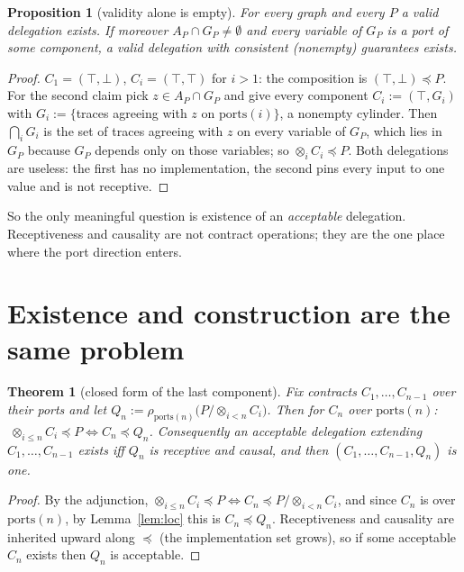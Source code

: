 \documentclass[10pt]{article}
\theoremstyle{plain}\newtheorem{theorem}{Theorem}\newtheorem{lemma}{Lemma}\newtheorem{proposition}{Proposition}\newtheorem{corollary}{Corollary}
\theoremstyle{definition}\newtheorem{definition}{Definition}
\newcommand{\refines}{\preccurlyeq}\newcommand{\comp}{\otimes}\newcommand{\Tr}{\mathrm{Tr}}
\newcommand{\ports}{\mathrm{ports}}\newcommand{\inp}{\mathrm{in}}\newcommand{\outp}{\mathrm{out}}
\begin{document}
\begin{proposition}[validity alone is empty]
For every graph and every $P$ a valid delegation exists. If moreover $A_P\cap G_P\neq\emptyset$ and every variable of $G_P$ is a port of some component, a valid delegation with consistent (nonempty) guarantees exists.
\end{proposition}
\begin{proof}
$C_1=(\top,\bot)$, $C_i=(\top,\top)$ for $i>1$: the composition is $(\top,\bot)\refines P$. For the second claim pick $z\in A_P\cap G_P$ and give every component $C_i:=(\top,G_i)$ with $G_i:=\{$traces agreeing with $z$ on $\ports(i)\}$, a nonempty cylinder. Then $\bigcap_iG_i$ is the set of traces agreeing with $z$ on every variable of $G_P$, which lies in $G_P$ because $G_P$ depends only on those variables; so $\comp_iC_i\refines P$. Both delegations are useless: the first has no implementation, the second pins every input to one value and is not receptive.
\end{proof}
So the only meaningful question is existence of an \emph{acceptable} delegation. Receptiveness and causality are not contract operations; they are the one place where the port direction enters.

\section{Existence and construction are the same problem}
\begin{theorem}[closed form of the last component]\label{thm:last}
Fix contracts $C_1,\dots,C_{n-1}$ over their ports and let $Q_n:=\rho_{\ports(n)}\big(P/\comp_{i<n}C_i\big)$. Then for $C_n$ over $\ports(n)$: $\ \comp_{i\le n}C_i\refines P\iff C_n\refines Q_n$. Consequently an acceptable delegation extending $C_1,\dots,C_{n-1}$ exists iff $Q_n$ is receptive and causal, and then $(C_1,\dots,C_{n-1},Q_n)$ is one.
\end{theorem}
\begin{proof}
By the adjunction, $\comp_{i\le n}C_i\refines P\iff C_n\refines P/\comp_{i<n}C_i$, and since $C_n$ is over $\ports(n)$, by Lemma~\ref{lem:loc} this is $C_n\refines Q_n$. Receptiveness and causality are inherited upward along $\refines$ (the implementation set grows), so if some acceptable $C_n$ exists then $Q_n$ is acceptable.
\end{proof}
\end{document}
